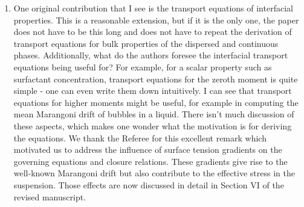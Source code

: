 \documentclass[10pt,a4paper]{article}
\newcommand{\tb}[1]{\color{blue}#1\color{black}}
\newcommand{\tr}[1]{\color{red}#1\color{black}}
\begin{document}
\begin{enumerate}
{                %
    }
    \item One original contribution that I see is the transport equations of interfacial properties. This
    is a reasonable extension, but if it is the only one, the paper does not have to be this long and
    does not have to repeat the derivation of transport equations for bulk properties of the
    dispersed and continuous phases. 
    Additionally, what do the authors foresee the interfacial
    transport equations being useful for? For example, for a scalar property such as surfactant
    concentration, transport equations for the zeroth moment is quite simple - one can even write
    them down intuitively. I can see that transport equations for higher moments might be useful,
    for example in computing the mean Marangoni drift of bubbles in a liquid. There isn't much
    discussion of these aspects, which makes one wonder what the motivation is for deriving the
    equations.
    \tb{
        We thank the Referee for this excellent remark which motivated us to address the influence of surface tension gradients on the governing equations and closure relations. 
        These gradients give rise to the well-known Marangoni drift but also contribute to the effective stress in the suspension. 
        Those effects are now discussed in detail in Section VI of the revised manuscript.
        
}
\end{enumerate}
\end{document}
